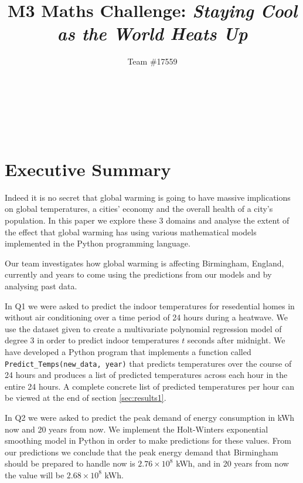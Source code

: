 \documentclass[11pt]{article}
\title{M3 Maths Challenge: \textit{Staying Cool as the World Heats Up}}
\author{Team \#17559}
\makeatletter
\renewcommand{\maketitle}{
    \begin{center}
        {\sffamily\bfseries\LARGE \@title} \\[1em]
        {\sffamily\large \@author} \\[1em]
        {\sffamily\large \thedate} \\[1em]
    \end{center}
    \vspace{1em}
}
\makeatother
\begin{document}
\maketitle

\section{Executive Summary}

Indeed it is no secret that global warming is going to have massive implications on global temperatures, a cities' economy and
the overall health of a city's population. In this paper we explore these 3 domains and analyse the extent of the effect that
global warming has using various mathematical models implemented in the Python programming language.

Our team investigates how global warming is affecting Birmingham, England, currently and years to come using the predictions
from our models and by analysing past data.
\vspace{0.3cm}

In Q1 we were asked to predict the indoor temperatures for resedential homes in without air conditioning over a time period of
24 hours during a heatwave. We use the dataset given \cite{m3} to create a multivariate polynomial regression model of degree
3 in order to predict indoor temperatures $t$ seconds after midnight. We have developed a Python program that implements a
function called \texttt{Predict\_Temps(new\_data, year)} that predicts temperatures over the course of 24 hours and produces a
list of predicted temperatures across each hour in the entire 24 hours. A complete concrete list of predicted temperatures
per hour can be viewed at the end of section \ref{sec:results1}.

In Q2 we were asked to predict the peak demand of energy consumption in kWh now and 20 years from now. We implement the
Holt-Winters exponential smoothing model in Python in order to make predictions for these values. From our predictions we
conclude that the peak energy demand that Birmingham should be prepared to handle now is $2.76 \times 10^8$ kWh, and in 20
years from now the value will be $2.68 \times 10^8$ kWh.
\end{document}
